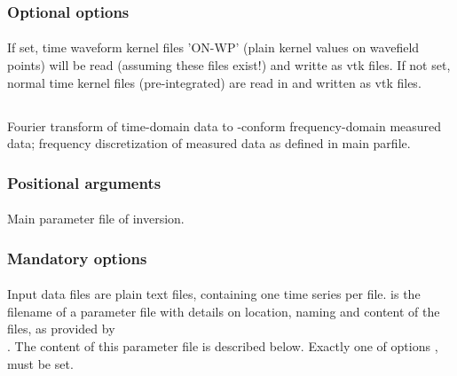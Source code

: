 \subsubsection{Optional options}
\paragraph{}
If set, time waveform kernel files 'ON-WP' (plain kernel values on wavefield points) will be read (assuming these files 
exist!) and writte as vtk files. If not set, normal time kernel files (pre-integrated) are read in and written as vtk files.
%
%
\subsection{} \label{programs_scripts,sec:bin_prog,sec:transform_measured_data}
Fourier transform of time-domain data to \ASKI{}-conform frequency-domain measured data; frequency 
discretization of measured data as defined in main parfile.
\subsubsection{Positional arguments}
\paragraph{}
Main parameter file of inversion.
\subsubsection{Mandatory options}
\paragraph{}
Input data files are plain text files, containing one time series per file.  is the filename
of a parameter file with details on location, naming and content of the files, as provided by \\
 .
The content of this parameter file is described below.
Exactly one of options ,  must be set.
